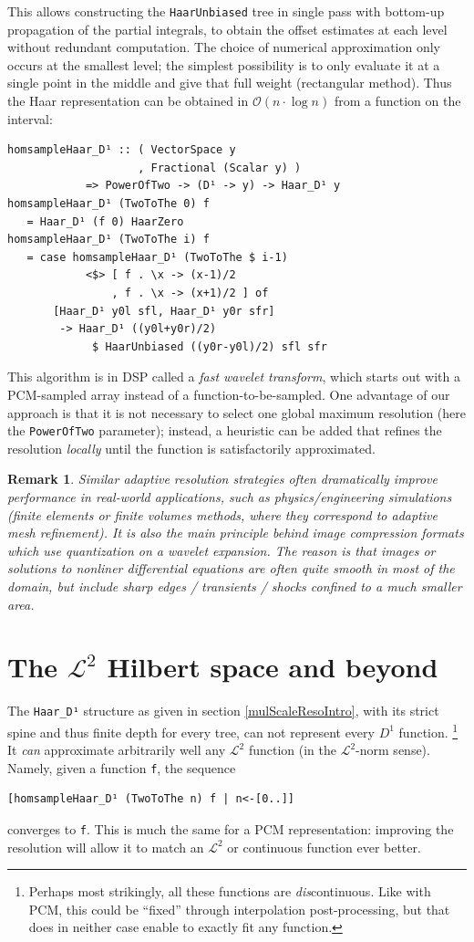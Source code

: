 \documentclass[final,sigplan]{acmart}\settopmatter{printfolios=true,printccs=false,printacmref=false}
\theoremstyle{acmplain}
\theoremstyle{acmdefinition}
\newtheorem{remark}[theorem]{Remark}
\begin{document}
This allows constructing the \lstinline`HaarUnbiased` tree in single pass with bottom-up propagation of the partial integrals, to obtain the offset estimates at each level without redundant computation.
The choice of numerical approximation only occurs at the smallest level;
the simplest possibility is to only evaluate it at a single point in the middle and give that full weight (rectangular method).
Thus the Haar representation can be obtained in $\mathcal{O}(n\cdot\log n)$ from a function on the interval:
\begin{lstlisting}
homsampleHaar_D¹ :: ( VectorSpace y
                    , Fractional (Scalar y) )
            => PowerOfTwo -> (D¹ -> y) -> Haar_D¹ y
homsampleHaar_D¹ (TwoToThe 0) f
   = Haar_D¹ (f 0) HaarZero
homsampleHaar_D¹ (TwoToThe i) f
   = case homsampleHaar_D¹ (TwoToThe $ i-1)
            <$> [ f . \x -> (x-1)/2
                , f . \x -> (x+1)/2 ] of
       [Haar_D¹ y0l sfl, Haar_D¹ y0r sfr]
        -> Haar_D¹ ((y0l+y0r)/2)
             $ HaarUnbiased ((y0r-y0l)/2) sfl sfr
\end{lstlisting}
This algorithm is in DSP called a \emph{fast wavelet transform}, which starts out with a PCM-sampled array instead of a function-to-be-sampled.
One advantage of our approach is that it is not necessary to select one global maximum resolution (here the \lstinline`PowerOfTwo` parameter); instead, a heuristic can be added that refines the resolution \emph{locally} until the function is satisfactorily approximated.
\begin{remark}
Similar adaptive resolution strategies often dramatically improve performance in real-world applications, such as physics/engineering simulations (finite elements or finite volumes methods, where they correspond to adaptive mesh refinement).
It is also the main principle behind image compression formats which use quantization on a wavelet expansion.
The reason is that images or solutions to nonliner differential equations are often quite smooth in most of the domain, but include sharp edges / transients / shocks confined to a much smaller area.
\end{remark}

\section{The $\mathcal{L}^2$ Hilbert space and beyond}
The \verb`Haar_D¹` structure as given in section \ref{mulScaleResoIntro}, with its strict spine and thus finite depth for every tree, can not represent every $D^1$ function. \footnote{Perhaps most strikingly, all these functions are \emph{dis}continuous. Like with PCM, this could be “fixed” through interpolation post-processing, but that does in neither case enable to exactly fit any function.}
It \emph{can} approximate arbitrarily well any $\mathcal{L}^2$ function (in the $\mathcal{L}^2$-norm sense). Namely, given a function \verb`f`, the sequence
\begin{lstlisting}
[homsampleHaar_D¹ (TwoToThe n) f | n<-[0..]]
\end{lstlisting}
converges to \verb`f`. This is much the same for a PCM representation: improving the resolution will allow it to match an $\mathcal{L}^2$ or continuous function ever better.
\end{document}

